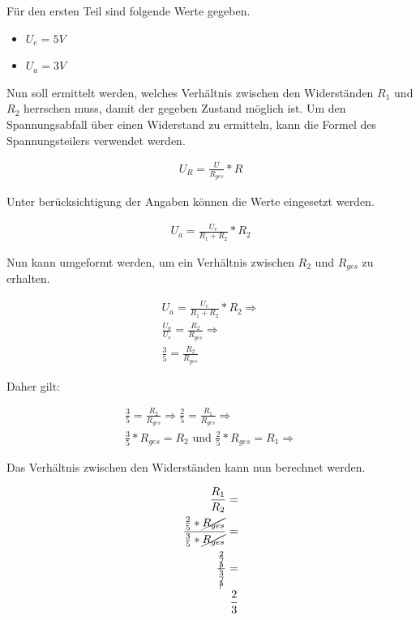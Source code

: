Für den ersten Teil sind folgende Werte gegeben.
\begin{itemize}
    \item $U_e = 5V$
    \item $U_a = 3V$
\end{itemize}

\newpage

Nun soll ermittelt werden, welches Verhältnis zwischen den Widerständen $R_1$ und $R_2$ herrschen muss, damit der gegeben Zustand möglich ist.
Um den Spannungsabfall über einen Widerstand zu ermitteln, kann die Formel des Spannungsteilers verwendet werden.

\begin{align}
    U_R = \frac{U}{R_{ges}} * R
\end{align}

Unter berücksichtigung der Angaben können die Werte eingesetzt werden.

\begin{align}
    U_a = \frac{U_e}{R_1 + R_2} * R_2
\end{align}

Nun kann umgeformt werden, um ein Verhältnis zwischen $R_2$ und $R_{ges}$ zu erhalten.

\begin{align}
    U_a = \frac{U_e}{R_1 + R_2} * R_2 \Rightarrow\\
    \frac{U_a}{U_e} = \frac{R_2}{R_{ges}} \Rightarrow\\
    \frac{3}{5} = \frac{R_2}{R_{ges}}
\end{align}

Daher gilt:

\begin{align}
    \frac{3}{5} = \frac{R_2}{R_{ges}} \Rightarrow \frac{2}{5} = \frac{R_1}{R_{ges}} \Rightarrow \\
    \frac{3}{5} * R_{ges} = R_2 \text{ und } \frac{2}{5} * R_{ges} = R_1 \Rightarrow
\end{align}

Das Verhältnis zwischen den Widerständen kann nun berechnet werden.

\begin{align}
    \frac{R_1}{R_2} = \\
    \frac{\frac{2}{5} * \cancel{R_{ges}}}{\frac{3}{5} * \cancel{R_{ges}}} = \\
    \frac{\frac{2}{\cancel{5}}}{\frac{3}{\cancel{5}}} = \\
    \frac{2}{3}
\end{align}

